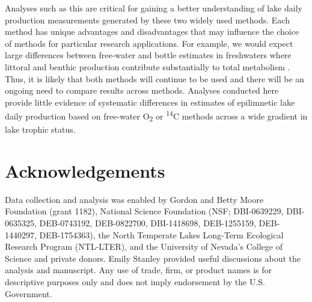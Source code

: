 \documentclass[12pt, oneside]{article}
\begin{document}
Analyses such as this are critical for gaining a better understanding of lake daily production measurements generated by these two widely used methods. Each method has unique advantages and disadvantages that may influence the choice of methods for particular research applications. For example, we would expect large differences between free-water and bottle estimates in freshwaters where littoral and benthic production contribute substantially to total metabolism \citep{lauster_gross_2006, VandeBogert_Carpenter_Cole_Pace_2007}. Thus, it is likely that both methods will continue to be used and there will be an ongoing need to compare results across methods. Analyses conducted here provide little evidence of systematic differences in estimates of epilimnetic lake daily production based on free-water O\textsubscript{2} or \textsuperscript{14}C methods across a wide gradient in lake trophic status.



\newpage



\clearpage
\section*{Acknowledgements}
Data collection and analysis was enabled by Gordon and Betty Moore Foundation (grant 1182), National Science Foundation (NSF; DBI-0639229, DBI-0635325, DEB-0743192, DEB-0822700, DBI-1418698, DEB-1255159, DEB-1440297, DEB-1754363), the North Temperate Lakes Long-Term Ecological Research Program (NTL-LTER), and the University of Nevada's College of Science and private donors. Emily Stanley provided useful discussions about the analysis and manuscript. Any use of trade, firm, or product names is for descriptive purposes only and does not imply endorsement by the U.S. Government.

\newpage
\end{document}
